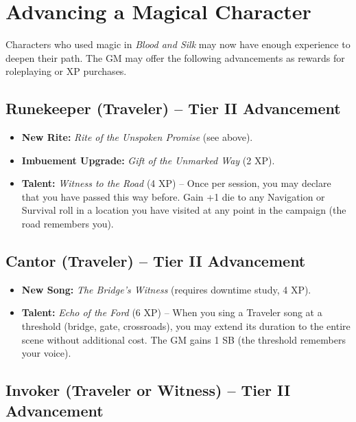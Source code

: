 \documentclass[10pt,twoside]{book}
\begin{document}
\section*{Advancing a Magical Character}

Characters who used magic in \textit{Blood and Silk} may now have enough experience to deepen their path. The GM may offer the following advancements as rewards for roleplaying or XP purchases.

\subsection*{Runekeeper (Traveler) -- Tier II Advancement}

\begin{itemize}
\item \textbf{New Rite:} \textit{Rite of the Unspoken Promise} (see above).
\item \textbf{Imbuement Upgrade:} \textit{Gift of the Unmarked Way} (2 XP).
\item \textbf{Talent:} \textit{Witness to the Road} (4 XP) -- Once per session, you may declare that you have passed this way before. Gain +1 die to any Navigation or Survival roll in a location you have visited at any point in the campaign (the road remembers you).
\end{itemize}

\subsection*{Cantor (Traveler) -- Tier II Advancement}

\begin{itemize}
\item \textbf{New Song:} \textit{The Bridge's Witness} (requires downtime study, 4 XP).
\item \textbf{Talent:} \textit{Echo of the Ford} (6 XP) -- When you sing a Traveler song at a threshold (bridge, gate, crossroads), you may extend its duration to the entire scene without additional cost. The GM gains 1 SB (the threshold remembers your voice).
\end{itemize}

\subsection*{Invoker (Traveler or Witness) -- Tier II Advancement}
\end{document}
